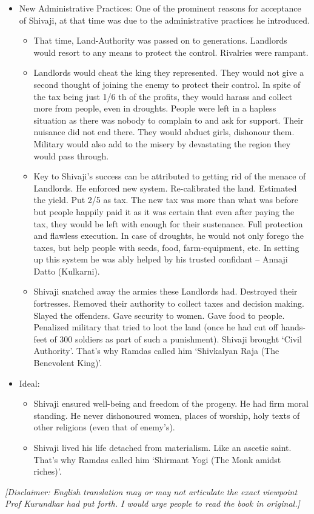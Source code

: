 \begin{itemize}
\item New Administrative Practices: One of the prominent reasons for acceptance of Shivaji, at that time was due to the administrative practices he introduced.
	\begin{itemize}
	\item That time, Land-Authority was passed on to generations. Landlords would resort to any means to protect the control. Rivalries were rampant.
	\item Landlords would cheat the king they represented. They would not give a second thought of joining the enemy to protect their control. In spite of the tax being just 1/6 th of the profits, they would harass and collect more from people, even in droughts. People were left in a hapless situation as there was nobody to complain to and ask for support. Their nuisance did not end there. They would abduct girls, dishonour them. Military would also add to the misery by devastating the region they would pass through.
	\item Key to Shivaji’s success can be attributed to getting rid of the menace of Landlords. He enforced new system. Re-calibrated the land. Estimated the yield. Put 2/5 as tax. The new tax was more than what was before but people happily paid it as it was certain that even after paying the tax, they would be left with enough for their sustenance.  Full protection and flawless execution. In case of droughts, he would not only forego the taxes, but help people with seeds, food, farm-equipment, etc. In setting up this system he was ably helped by his trusted confidant – Annaji Datto (Kulkarni). 
	\item Shivaji snatched away the armies these Landlords had. Destroyed their fortresses. Removed their authority to collect taxes and decision making. Slayed the offenders. Gave security to women. Gave food to people. Penalized military that tried to loot the land (once he had cut off hands-feet of 300 soldiers as part of such a punishment). Shivaji brought ‘Civil Authority’. That’s why Ramdas called him ‘Shivkalyan Raja (The Benevolent King)’.
	\end{itemize}

\item Ideal:
	\begin{itemize}
	\item Shivaji ensured well-being and freedom of the progeny. He had firm moral standing. He never dishonoured women, places of worship, holy texts of other religions (even that of enemy’s).
	\item Shivaji lived his life detached from materialism. Like an ascetic saint. That’s why Ramdas called him ‘Shirmant Yogi (The Monk amidst riches)’.
	\end{itemize}

\end{itemize}

{\em [Disclaimer: English translation may or may not articulate the exact viewpoint Prof Kurundkar had put forth. I would urge people to read the book in original.]}

